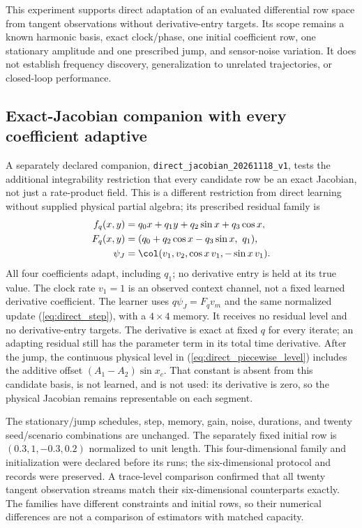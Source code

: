 This experiment supports direct adaptation of an evaluated differential
row space from tangent observations without derivative-entry targets.
Its scope remains a known harmonic basis, exact clock/phase, one initial
coefficient row, one stationary amplitude and one prescribed jump, and
sensor-noise variation. It does not establish frequency discovery,
generalization to unrelated trajectories, or closed-loop performance.

\subsection{Exact-Jacobian companion with every coefficient adaptive}
\label{sec:direct_jacobian_companion}
A separately declared companion, \texttt{direct\_jacobian\_20261118\_v1},
tests the additional integrability restriction that every candidate row be
an exact Jacobian, not just a rate-product field. This is a different
restriction from direct learning without supplied physical partial algebra;
its prescribed residual family is
\begin{align}
 f_q(x,y)&=q_0x+q_1y+q_2\sin x+q_3\cos x,\\
 F_q(x,y)&=(q_0+q_2\cos x-q_3\sin x,\ q_1),
 \label{eq:direct_jacobian_family}\\
 \psi_J&=\col(v_1,v_2,\cos x\,v_1,-\sin x\,v_1).
\end{align}
All four coefficients adapt, including $q_1$; no derivative entry is
held at its true value. The clock rate $v_1=1$ is an observed context
channel, not a fixed learned derivative coefficient. The learner uses
$q\psi_J=F_qv_m$ and the same normalized update
(\ref{eq:direct_step}), with a $4\times4$ memory. It receives no residual
level and no derivative-entry targets. The derivative is exact at fixed
$q$ for every iterate; an adapting residual still has the parameter term
in its total time derivative.
After the jump, the continuous physical level in
(\ref{eq:direct_piecewise_level}) includes the additive offset
$(A_1-A_2)\sin x_c$. That constant is absent from this candidate basis,
is not learned, and is not used: its derivative is zero, so the physical
Jacobian remains representable on each segment.

The stationary/jump schedules, step, memory, gain, noise, durations, and
twenty seed/scenario combinations are unchanged. The separately fixed
initial row is $(0.3,1,-0.3,0.2)$ normalized to unit length. This
four-dimensional family and initialization were declared before its runs;
the six-dimensional protocol and records were preserved. A trace-level
comparison confirmed that all twenty tangent observation streams match
their six-dimensional counterparts exactly. The families have different
constraints and initial rows, so their numerical differences are not a
comparison of estimators with matched capacity.

